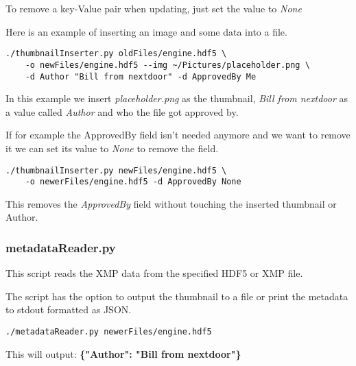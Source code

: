 To remove a key-Value pair when updating, just set the value to \emph{None}

Here is an example of inserting an image and some data into a file.
\begin{lstlisting}
./thumbnailInserter.py oldFiles/engine.hdf5 \
    -o newFiles/engine.hdf5 --img ~/Pictures/placeholder.png \
    -d Author "Bill from nextdoor" -d ApprovedBy Me
\end{lstlisting}
In this example we insert \emph{placeholder.png} as the thumbnail,
\emph{Bill from nextdoor} as a value called \emph{Author} and who the file got approved by.

If for example the ApprovedBy field isn't needed anymore and we want to remove it
we can set its value to \emph{None} to remove the field.

\begin{lstlisting}
./thumbnailInserter.py newFiles/engine.hdf5 \
    -o newerFiles/engine.hdf5 -d ApprovedBy None
\end{lstlisting}
This removes the \emph{ApprovedBy} field without touching the inserted thumbnail or Author.

\subsubsection{metadataReader.py}
This script reads the XMP data from the specified HDF5 or XMP file.

The script has the option to output the thumbnail to a file or print the metadata to stdout formatted as JSON.

\begin{lstlisting}
./metadataReader.py newerFiles/engine.hdf5
\end{lstlisting}
This will output: \textbf{\{"Author": "Bill from nextdoor"\}}